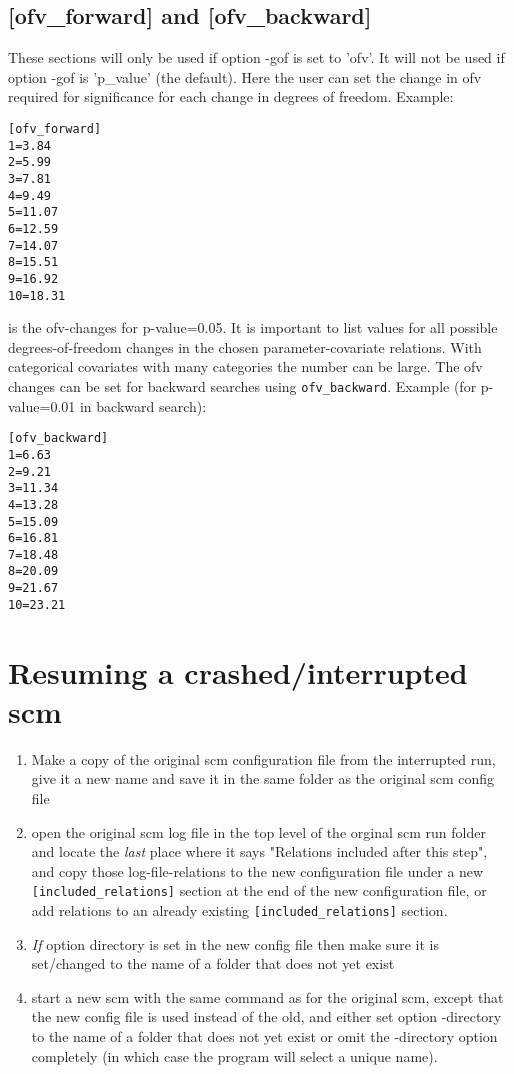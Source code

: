 \subsection{[ofv\_forward] and [ofv\_backward]}
These sections will only be used if option -gof is set to 'ofv'. It will not
be used if option -gof is 'p\_value' (the default). Here the user can set
the change in ofv required for significance
for each change in degrees of freedom.
Example:
\begin{verbatim}
[ofv_forward]
1=3.84
2=5.99
3=7.81
4=9.49
5=11.07
6=12.59
7=14.07
8=15.51
9=16.92
10=18.31
\end{verbatim}
is the ofv-changes for p-value=0.05. It is important to list values for all
possible degrees-of-freedom changes in the chosen parameter-covariate relations.
With categorical covariates with many categories the number can be large.
The ofv changes can be set for backward searches
using \verb|ofv_backward|. Example (for p-value=0.01 in backward search):
\begin{verbatim}
[ofv_backward]
1=6.63
2=9.21
3=11.34
4=13.28
5=15.09
6=16.81
7=18.48
8=20.09
9=21.67
10=23.21
\end{verbatim}


\section{Resuming a crashed/interrupted scm}
\begin{enumerate}
\item Make a copy of the original scm configuration file from the interrupted run, give it a new name and save it in the same folder as the original scm config file
\item open the original scm log file in the top level of the orginal scm run folder and locate the \emph{last} place where it says "Relations included after this step", and copy those log-file-relations to the new configuration file under a new \verb|[included_relations]| section at the end of the new configuration file, or add relations to an already existing \verb|[included_relations]| section. 
\item \emph{If} option directory is set in the new config file then make sure it is 
set/changed to the name of a folder that does not yet exist
\item start a new scm with the same command as for the original scm, except that the new config file is used instead of the old, 
and either set option -directory to the name of a folder that does not yet exist 
or omit the -directory option completely (in which case the program will select a unique name). 
\end{enumerate}
